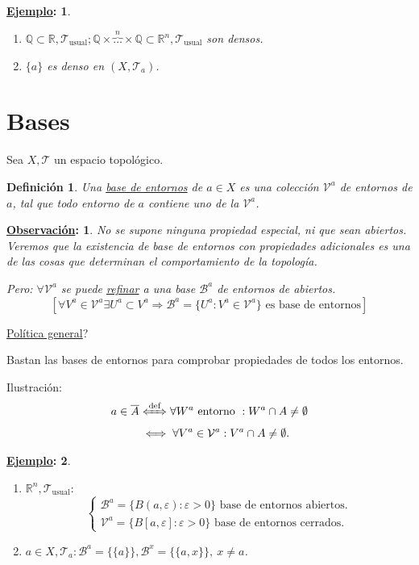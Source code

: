 \documentclass[10pt,a4paper,openright]{book}
\theoremstyle{break}
\newtheorem*{defi}{Definición}
\newtheorem*{obs}{\underline{Observación}:}
\newtheorem*{ej}{\underline{Ejemplo}:}
\begin{document}
\begin{ej}
\begin{enumerate}
    \item $\mathbb{Q} \subset \mathbb{R}, \mathcal{T}_{\text{usual}}; \mathbb{Q} \times \overbrace{\ldots}^{n} \times \mathbb{Q} \subset \mathbb{R}^n, \mathcal{T}_{\text{usual}}$ son densos.
    \item $\{a\}$ es denso en $\left( X, \mathcal{T}_a \right)$.
\end{enumerate}
\end{ej}

\section{Bases}%
\label{sec:bases}
Sea $X, \mathcal{T}$ un espacio topológico.
\begin{defi}
Una \underline{base de entornos} de $a \in X$ es una colección $\mathcal{V}^a$ de entornos de $a$, tal que todo entorno de $a$ contiene uno de la $\mathcal{V}^a$.
\end{defi}

\begin{obs}
No se supone ninguna propiedad especial, ni que sean abiertos. Veremos que la existencia de base de entornos con propiedades adicionales es una de las cosas que determinan el comportamiento de la topología.

Pero: $\forall \mathcal{V}^a$ se puede \underline{refinar} a una base $\mathcal{B}^a$ de entornos de abiertos. 
\[
\left[ \forall V^a \in \mathcal{V}^a \exists U^a \subset V^a \Rightarrow \mathcal{B}^a = \{U^a: V^a \in \mathcal{V}^a\} \text{ es base de entornos} \right]
\]
\end{obs}

\underline{Política general}? 

Bastan las bases de entornos para comprobar propiedades de todos los entornos.

Ilustración:
\begin{align*}
    a \in \overline{A} &\xLeftrightarrow{\text{def}} \forall W^a \text{ entorno }: W^a \cap A \neq \emptyset\\
   &\iff \forall V^a \in \mathcal{V}^a: V^a\cap A \neq \emptyset 
.\end{align*}

\begin{ej}
\begin{enumerate}
    \item $\mathbb{R}^n, \mathcal{T}_{\text{usual}}: $
    \[
    \begin{cases}
    \mathcal{B}^a = \{B\left( a, \varepsilon \right): \varepsilon > 0\} \text{ base de entornos abiertos.}  \\
    \mathcal{V}^a = \{B\left[ a, \varepsilon \right]: \varepsilon > 0\} \text{ base de entornos cerrados.} 
    \end{cases} 
    \]
    \item $a \in X, \mathcal{T}_a : \mathcal{B}^a = \{\{a\}\}, \mathcal{B}^x = \{\{a, x\}\},\ x \neq a$.
\end{enumerate}
\end{ej}
\end{document}
